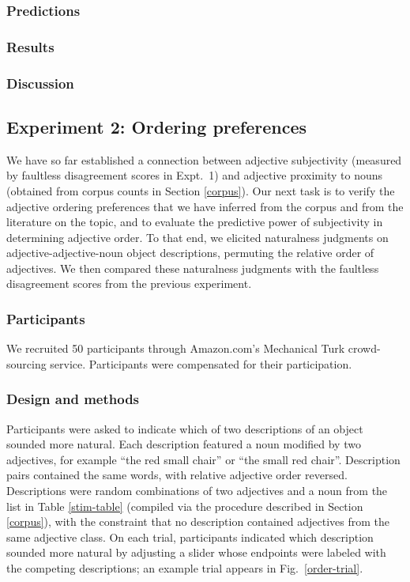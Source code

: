 \documentclass[11pt]{article}
\begin{document}
\subsubsection{Predictions}

\subsubsection{Results}

\subsubsection{Discussion}


\subsection{Experiment 2: Ordering preferences}

We have so far established a connection between adjective subjectivity (measured by faultless disagreement scores in Expt.~1) and adjective proximity to nouns (obtained from corpus counts in Section \ref{corpus}). Our next task is to verify the adjective ordering preferences that we have inferred from the corpus and from the literature on the topic, and to evaluate the predictive power of subjectivity in determining adjective order. To that end, we elicited naturalness judgments on adjective-adjective-noun object descriptions, permuting the relative order of adjectives. We then compared these naturalness judgments with the faultless disagreement scores from the previous experiment.

\subsubsection{Participants}

We recruited 50 participants through Amazon.com's Mechanical Turk crowd-sourcing service. Participants were compensated for their participation.

\subsubsection{Design and methods}

Participants were asked to indicate which of two descriptions of an object sounded more natural. Each description featured a noun modified by two adjectives, for example ``the red small chair'' or ``the small red chair''. Description pairs contained the same words, with relative adjective order reversed. Descriptions were random combinations of two adjectives and a noun from the list in Table \ref{stim-table} (compiled via the procedure described in Section \ref{corpus}), with the constraint that no description contained adjectives from the same adjective class.
On each trial, participants indicated which description sounded more natural by adjusting a slider whose endpoints were labeled with the competing descriptions; an example trial appears in Fig.~\ref{order-trial}.
\end{document}
